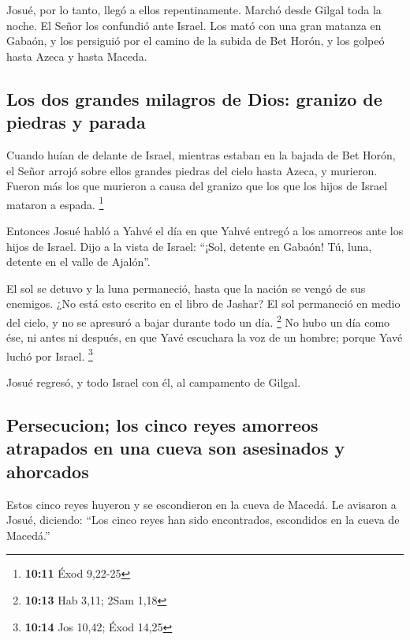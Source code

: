  Josué, por lo tanto, llegó a ellos repentinamente. Marchó
desde Gilgal toda la noche.  El Señor los confundió ante
Israel. Los mató con una gran matanza en Gabaón, y los persiguió por el
camino de la subida de Bet Horón, y los golpeó hasta Azeca y hasta
Maceda.

\hypertarget{los-dos-grandes-milagros-de-dios-granizo-de-piedras-y-parada}{%
\subsection{Los dos grandes milagros de Dios: granizo de piedras y
parada}\label{los-dos-grandes-milagros-de-dios-granizo-de-piedras-y-parada}}

 Cuando huían de delante de Israel, mientras estaban en
la bajada de Bet Horón, el Señor arrojó sobre ellos grandes piedras del
cielo hasta Azeca, y murieron. Fueron más los que murieron a causa del
granizo que los que los hijos de Israel mataron a espada. \footnote{\textbf{10:11}
  Éxod 9,22-25}

 Entonces Josué habló a Yahvé el día en que Yahvé entregó
a los amorreos ante los hijos de Israel. Dijo a la vista de Israel:
``¡Sol, detente en Gabaón! Tú, luna, detente en el valle de Ajalón''.

 El sol se detuvo y la luna permaneció, hasta que la
nación se vengó de sus enemigos. ¿No está esto escrito en el libro de
Jashar? El sol permaneció en medio del cielo, y no se apresuró a bajar
durante todo un día. \footnote{\textbf{10:13} Hab 3,11; 2Sam 1,18}
 No hubo un día como ése, ni antes ni después, en que
Yavé escuchara la voz de un hombre; porque Yavé luchó por Israel.
\footnote{\textbf{10:14} Jos 10,42; Éxod 14,25}

 Josué regresó, y todo Israel con él, al campamento de
Gilgal.

\hypertarget{persecucion-los-cinco-reyes-amorreos-atrapados-en-una-cueva-son-asesinados-y-ahorcados}{%
\subsection{Persecucion; los cinco reyes amorreos atrapados en una cueva
son asesinados y
ahorcados}\label{persecucion-los-cinco-reyes-amorreos-atrapados-en-una-cueva-son-asesinados-y-ahorcados}}

 Estos cinco reyes huyeron y se escondieron en la cueva
de Macedá.  Le avisaron a Josué, diciendo: ``Los cinco
reyes han sido encontrados, escondidos en la cueva de Macedá.''

